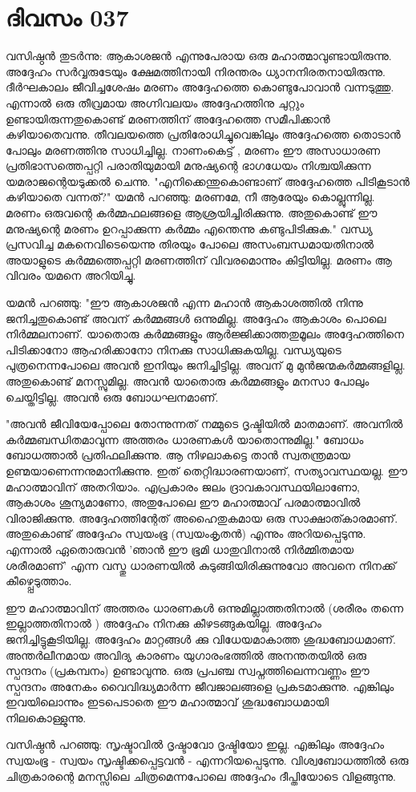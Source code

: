  
\section{ദിവസം 037}


വസിഷ്ഠന്‍ തുടര്‍ന്നു: ആകാശജന്‍ എന്നുപേരായ ഒരു മഹാത്മാവുണ്ടായിരുന്നു. അദ്ദേഹം സര്‍വ്വരുടേയും ക്ഷേമത്തിനായി നിരന്തരം ധ്യാനനിരതനായിരുന്നു. ദീര്‍ഘകാലം ജീവിച്ചശേഷം മരണം അദ്ദേഹത്തെ കൊണ്ടുപോവാന്‍ വന്നടുത്തു. എന്നാല്‍ ഒരു തീവ്രമായ അഗ്നിവലയം അദ്ദേഹത്തിനു ചുറ്റും ഉണ്ടായിരുന്നതുകൊണ്ട്‌ മരണത്തിന്‌ അദ്ദേഹത്തെ സമീപിക്കാന്‍ കഴിയാതെവന്നു. തീവലയത്തെ പ്രതിരോധിച്ചുവെങ്കിലും അദ്ദേഹത്തെ തൊടാന്‍ പോലും മരണത്തിനു സാധിച്ചില്ല. നാണംകെട്ട്‌ , മരണം ഈ അസാധാരണ പ്രതിഭാസത്തെപ്പറ്റി പരാതിയുമായി മനുഷ്യന്റെ ഭാഗധേയം നിശ്ചയിക്കുന്ന യമരാജന്റെയടുക്കല്‍ ചെന്നു. "എനിക്കെന്തുകൊണ്ടാണ്‌ അദ്ദേഹത്തെ പിടികൂടാന്‍ കഴിയാതെ വന്നത്‌?" യമന്‍ പറഞ്ഞു: മരണമേ, നീ ആരേയും കൊല്ലുന്നില്ല. മരണം ഒരുവന്റെ കര്‍മ്മഫലങ്ങളെ ആശ്രയിച്ചിരിക്കുന്നു. അതുകൊണ്ട്‌ ഈ മനുഷ്യന്റെ മരണം ഉറപ്പാക്കുന്ന കര്‍മ്മം എന്തെന്നു കണ്ടുപിടിക്കുക." വന്ധ്യ പ്രസവിച്ച മകനെവിടെയെന്നു തിരയും പോലെ അസംബന്ധമായതിനാല്‍ അയാളുടെ കര്‍മ്മത്തെപ്പറ്റി മരണത്തിന്‌ വിവരമൊന്നും കിട്ടിയില്ല. മരണം ആ വിവരം യമനെ അറിയിച്ചു.

യമന്‍ പറഞ്ഞു: "ഈ ആകാശജന്‍ എന്ന മഹാന്‍ ആകാശത്തില്‍ നിന്നു ജനിച്ചതുകൊണ്ട്‌ അവന്‌ കര്‍മ്മങ്ങള്‍ ഒന്നുമില്ല. അദ്ദേഹം ആകാശം പൊലെ നിര്‍മ്മലനാണ്‌. യാതൊരു കര്‍മ്മങ്ങളും ആര്‍ജ്ജിക്കാത്തതുമൂലം അദ്ദേഹത്തിനെ പിടിക്കാനോ ആഹരിക്കാനോ നിനക്കു സാധിക്കുകയില്ല. വന്ധ്യയുടെ പുത്രനെന്നപോലെ അവന്‍ ഇനിയും ജനിച്ചിട്ടില്ല. അവന്‌ മു  മുന്‍ജന്മകര്‍മ്മങ്ങളില്ല. അതുകൊണ്ട്‌ മനസ്സുമില്ല. അവന്‍ യാതൊരു കര്‍മ്മങ്ങളും മനസാ പോലും ചെയ്തിട്ടില്ല. അവന്‍ ഒരു ബോധഘനമാണ്‌. 

"അവന്‍ ജീവിയേപ്പോലെ തോന്നുന്നത്‌ നമ്മുടെ ദൃഷ്ടിയില്‍ മാതമാണ്‌. അവനില്‍ കര്‍മ്മബന്ധിതമാവുന്ന അത്തരം ധാരണകള്‍ യാതൊന്നുമില്ല." ബോധം ബോധത്താല്‍ പ്രതിഫലിക്കുന്നു. ആ നിഴലാകട്ടെ താന്‍ സ്വതന്ത്രമായ ഉണ്മയാണെന്നനുമാനിക്കുന്നു. ഇത്‌ തെറ്റിദ്ധാരണയാണ്‌, സത്യാവസ്ഥയല്ല. ഈ മഹാത്മാവിന്‌ അതറിയാം. എപ്രകാരം ജലം ദ്രാവകാവസ്ഥയിലാണോ, ആകാശം ശൂന്യമാണോ, അതുപോലെ ഈ മഹാത്മാവ്‌ പരമാത്മാവില്‍ വിരാജിക്കുന്നു. അദ്ദേഹത്തിന്റേത്‌ അഹൈതുകമായ ഒരു സാക്ഷാത്കാരമാണ്‌. അതുകൊണ്ട്‌ അദ്ദേഹം സ്വയംഭൂ (സ്വയംകൃതന്‍) എന്നും അറിയപ്പെടുന്നു. എന്നാല്‍ ഏതൊരുവന്‍ 'ഞാന്‍ ഈ ഭൂമി ധാതുവിനാല്‍ നിര്‍മ്മിതമായ ശരീരമാണ്‌' എന്ന വസ്തു ധാരണയില്‍ കുടുങ്ങിയിരിക്കുന്നുവോ അവനെ നിനക്ക്‌ കീഴ്പ്പെടുത്താം. 

ഈ മഹാത്മാവിന്‌ അത്തരം ധാരണകള്‍ ഒന്നുമില്ലാത്തതിനാല്‍ (ശരീരം തന്നെ ഇല്ലാത്തതിനാല്‍ ) അദ്ദേഹം നിനക്കു കീഴടങ്ങുകയില്ല. അദ്ദേഹം ജനിച്ചിട്ടുകൂടിയില്ല. അദ്ദേഹം മാറ്റങ്ങള്‍ ക്കു വിധേയമാകാത്ത ശുദ്ധബോധമാണ്‌. അന്തര്‍ലീനമായ അവിദ്യ കാരണം യുഗാരംഭത്തില്‍ അനന്തതയില്‍ ഒരു  സ്പന്ദനം  (പ്രകമ്പനം) ഉണ്ടാവുന്നു. ഒരു പ്രപഞ്ച സ്വപ്നത്തിലെന്നവണ്ണം ഈ സ്പന്ദനം  അനേകം വൈവിദ്ധ്യമാര്‍ന്ന ജീവജാലങ്ങളെ പ്രകടമാക്കുന്നു. എങ്കിലും ഇവയിലൊന്നും ഇടപെടാതെ ഈ മഹാത്മാവ്‌ ശുദ്ധബോധമായി നിലകൊള്ളുന്നു.

വസിഷ്ഠന്‍ പറഞ്ഞു: സൃഷ്ടാവില്‍ ദൃഷ്ടാവോ ദൃഷ്ടിയോ ഇല്ല. എങ്കിലും അദ്ദേഹം സ്വയംഭൂ - സ്വയം സൃഷ്ടിക്കപ്പെട്ടവന്‍ - എന്നറിയപ്പെടുന്നു. വിശ്വബോധത്തില്‍ ഒരു ചിത്രകാരന്റെ മനസ്സിലെ ചിത്രമെന്നപോലെ അദ്ദേഹം ദീപ്തിയോടെ വിളങ്ങുന്നു.

